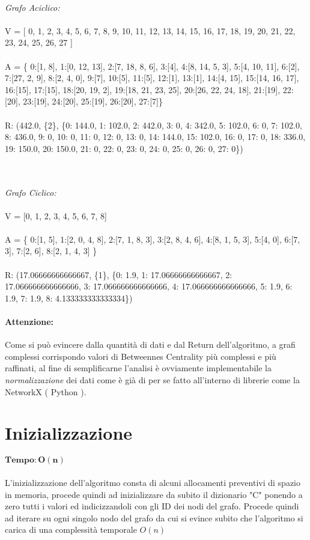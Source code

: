 \emph{ \\Grafo Aciclico: \\ \\}
V = [ 0, 1, 2, 3, 4, 5, 6, 7, 8, 9, 10, 11, 12, 13, 14, 15, 16, 17, 18, 19, 20, 21, 22, 23, 24, 25, 26, 27 ]
\\ \\
A = \{ 0:[1, 8],  1:[0, 12, 13], 2:[7, 18, 8, 6], 3:[4], 4:[8, 14, 5, 3], 5:[4, 10, 11], 6:[2], 7:[27, 2, 9], 8:[2, 4, 0], 9:[7], 10:[5], 11:[5], 12:[1], 13:[1], 14:[4, 15], 15:[14, 16, 17], 16:[15], 17:[15], 18:[20, 19, 2], 19:[18, 21, 23, 25], 20:[26, 22, 24, 18], 21:[19], 22:[20], 23:[19], 24:[20], 25:[19], 26:[20], 27:[7]\}
\\ \\
R: (442.0, \{2\}, \{0: 144.0, 1: 102.0, 2: 442.0, 3: 0, 4: 342.0, 5: 102.0, 6: 0, 7: 102.0, 8: 436.0, 9: 0, 10: 0, 11: 0, 12: 0, 13: 0, 14: 144.0, 15: 102.0, 16: 0, 17: 0, 18: 336.0, 19: 150.0, 20: 150.0, 21: 0, 22: 0, 23: 0, 24: 0, 25: 0, 26: 0, 27: 0\})


\emph{\\ \\ Grafo Ciclico: \\ \\}
V = [0, 1, 2, 3, 4, 5, 6, 7, 8]
\\ \\
A = \{ 0:[1, 5], 1:[2, 0, 4, 8], 2:[7, 1, 8, 3], 3:[2, 8, 4, 6], 4:[8, 1, 5, 3], 5:[4, 0], 6:[7, 3], 7:[2, 6], 8:[2, 1, 4, 3] \}
\\ \\
R: (17.06666666666667, \{1\}, \{0: 1.9, 1: 17.06666666666667, 2: 17.066666666666666, 3: 17.066666666666666, 4: 17.066666666666666, 5: 1.9, 6: 1.9, 7: 1.9, 8: 4.133333333333334\})
\\
\noindent 
\paragraph{Attenzione:}Come si può evincere dalla quantità di dati e dal Return dell'algoritmo, a grafi complessi corrispondo valori di Betweennes Centrality più complessi e più raffinati, al fine di semplificarne l'analisi è ovviamente implementabile la \emph{normalizzazione} dei dati come è già di per se fatto all'interno di librerie come la NetworkX ( Python ).


\newpage

\section{Inizializzazione}
$\mathbf{Tempo: O(n)}$\\ 	\\
L'inizializzazione dell'algoritmo consta di alcuni allocamenti preventivi di spazio in memoria, procede quindi ad inizializzare da subito il dizionario "C" ponendo a zero tutti i valori ed indicizzandoli con gli ID dei nodi del grafo. Procede quindi ad iterare su ogni singolo nodo del grafo da cui si evince subito che l'algoritmo si carica di una complessità temporale $O(n)$

